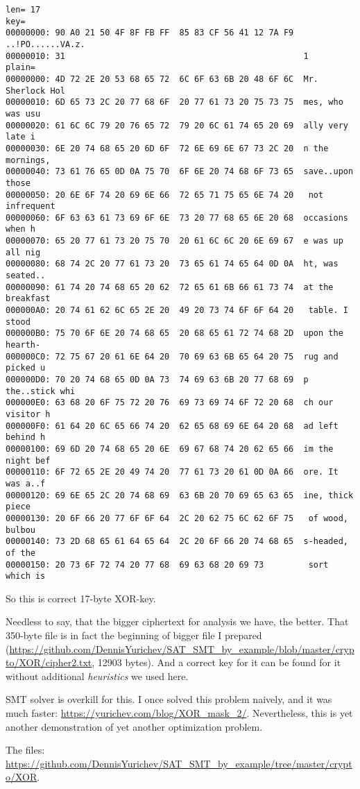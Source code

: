 \begin{lstlisting}
len= 17
key=
00000000: 90 A0 21 50 4F 8F FB FF  85 83 CF 56 41 12 7A F9  ..!PO......VA.z.
00000010: 31                                                1
plain=
00000000: 4D 72 2E 20 53 68 65 72  6C 6F 63 6B 20 48 6F 6C  Mr. Sherlock Hol
00000010: 6D 65 73 2C 20 77 68 6F  20 77 61 73 20 75 73 75  mes, who was usu
00000020: 61 6C 6C 79 20 76 65 72  79 20 6C 61 74 65 20 69  ally very late i
00000030: 6E 20 74 68 65 20 6D 6F  72 6E 69 6E 67 73 2C 20  n the mornings,
00000040: 73 61 76 65 0D 0A 75 70  6F 6E 20 74 68 6F 73 65  save..upon those
00000050: 20 6E 6F 74 20 69 6E 66  72 65 71 75 65 6E 74 20   not infrequent
00000060: 6F 63 63 61 73 69 6F 6E  73 20 77 68 65 6E 20 68  occasions when h
00000070: 65 20 77 61 73 20 75 70  20 61 6C 6C 20 6E 69 67  e was up all nig
00000080: 68 74 2C 20 77 61 73 20  73 65 61 74 65 64 0D 0A  ht, was seated..
00000090: 61 74 20 74 68 65 20 62  72 65 61 6B 66 61 73 74  at the breakfast
000000A0: 20 74 61 62 6C 65 2E 20  49 20 73 74 6F 6F 64 20   table. I stood
000000B0: 75 70 6F 6E 20 74 68 65  20 68 65 61 72 74 68 2D  upon the hearth-
000000C0: 72 75 67 20 61 6E 64 20  70 69 63 6B 65 64 20 75  rug and picked u
000000D0: 70 20 74 68 65 0D 0A 73  74 69 63 6B 20 77 68 69  p the..stick whi
000000E0: 63 68 20 6F 75 72 20 76  69 73 69 74 6F 72 20 68  ch our visitor h
000000F0: 61 64 20 6C 65 66 74 20  62 65 68 69 6E 64 20 68  ad left behind h
00000100: 69 6D 20 74 68 65 20 6E  69 67 68 74 20 62 65 66  im the night bef
00000110: 6F 72 65 2E 20 49 74 20  77 61 73 20 61 0D 0A 66  ore. It was a..f
00000120: 69 6E 65 2C 20 74 68 69  63 6B 20 70 69 65 63 65  ine, thick piece
00000130: 20 6F 66 20 77 6F 6F 64  2C 20 62 75 6C 62 6F 75   of wood, bulbou
00000140: 73 2D 68 65 61 64 65 64  2C 20 6F 66 20 74 68 65  s-headed, of the
00000150: 20 73 6F 72 74 20 77 68  69 63 68 20 69 73         sort which is
\end{lstlisting}

So this is correct 17-byte XOR-key.

Needless to say, that the bigger ciphertext for analysis we have, the better.
That 350-byte file is in fact the beginning of bigger file I prepared
(\url{https://github.com/DennisYurichev/SAT_SMT_by_example/blob/master/crypto/XOR/cipher2.txt}, 12903 bytes).
And a correct key for it can be found for it without additional \textit{heuristics} we used here.

SMT solver is overkill for this. I once solved this problem naively, and it was much faster:
\url{https://yurichev.com/blog/XOR_mask_2/}.
Nevertheless, this is yet another demonstration of yet another optimization problem.

The files: \url{https://github.com/DennisYurichev/SAT_SMT_by_example/tree/master/crypto/XOR}.

